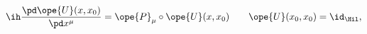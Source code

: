 \begin{equation}	\label{12.116}
\ih \frac{\pd\ope{U}(x,x_0)}{\pd x^\mu}
=
\ope{P}_{\mu}\circ \ope{U}(x,x_0)
\qquad
\ope{U}(x_0,x_0) = \id_\Hil ,
	\end{equation}

